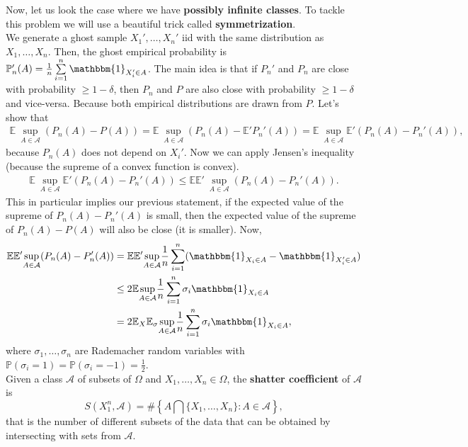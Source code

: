 \documentclass[11pt, english]{article}
\begin{document}
Now, let us look the case where we have \textbf{possibly infinite classes}. To tackle this problem we will use a beautiful trick called \textbf{symmetrization}.\\
We generate a ghost sample $X_1',\dots,X_n'$ iid with the same distribution as $X_1,\dots,X_n$. Then, the ghost empirical probability is $\mathbb{P}_n'(A)=\frac{1}{n}\sum\limits_{i=1}^n\mathbbm{1}_{X_i'\in A}$. The main idea is that if $P_n'$ and $P_n$ are close with probability $\geq 1-\delta$, then $P_n$ and $P$ are also close with probability $\geq 1-\delta$ and vice-versa. Because both empirical distributions are drawn from $P$. Let's show that
\begin{align}
	\mathbb{E}\ \underset{A\in\mathcal{A}}{\sup}(P_n(A)-P(A))=\mathbb{E}\ \underset{A\in\mathcal{A}}{\sup}(P_n(A)-\mathbb{E}'P_n'(A))=\mathbb{E}\ \underset{A\in\mathcal{A}}{\sup}\mathbb{E}'(P_n(A)-P_n'(A)), %
\end{align}
because $P_n(A)$ does not depend on $X_i'$. Now we can apply Jensen's inequality (because the supreme of a convex function is convex).
\begin{align}
	\mathbb{E}\ \underset{A\in\mathcal{A}}{\sup}\mathbb{E}'(P_n(A)-P_n'(A))\leq \mathbb{E}\mathbb{E}'\ \underset{A\in\mathcal{A}}{\sup}(P_n(A)-P_n'(A)). %
\end{align}
 This in particular implies our previous statement, if the expected value of the supreme of $P_n(A)-P_n'(A)$ is small, then the expected value of the supreme of $P_n(A)-P(A)$ will also be close (it is smaller). Now,
 \begin{align}
 	\mathbb{E}\mathbb{E}'\underset{A\in\mathcal{A}}{\sup}(P_n(A)-P_n'(A))&=\mathbb{E}\mathbb{E}'\underset{A\in\mathcal{A}}{\sup}\frac{1}{n}\sum\limits_{i=1}^n(\mathbbm{1}_{X_i\in A}-\mathbbm{1}_{X_i'\in A})\\ %
 	&\leq 2\mathbb{E}\underset{A\in\mathcal{A}}{\sup}\frac{1}{n}\sum\limits_{i=1}^n\sigma_i\mathbbm{1}_{X_i\in A}\\
 	&=2\mathbb{E}_X\mathbb{E}_{\sigma}\underset{A\in\mathcal{A}}{\sup}\frac{1}{n}\sum\limits_{i=1}^n\sigma_i\mathbbm{1}_{X_i\in A},
 \end{align}
 where $\sigma_1,\dots,\sigma_n$ are Rademacher random variables with $\mathbb{P}(\sigma_i=1)=\mathbb{P}(\sigma_i=-1)=\frac{1}{2}$.\\
 
 Given a class $\mathcal{A}$ of subsets of $\Omega$ and $X_1,\dots,X_n\in \Omega$, the \textbf{shatter coefficient} of $\mathcal{A}$ is 
 \begin{equation}
 	S(X_1^n,\mathcal{A})=\#\left\{A\bigcap\{X_1,\dots,X_n\}:A\in\mathcal{A}\right\},
 \end{equation}
 that is the number of different subsets of the data that can be obtained by intersecting with sets from $\mathcal{A}$.\\
 
\end{document}
